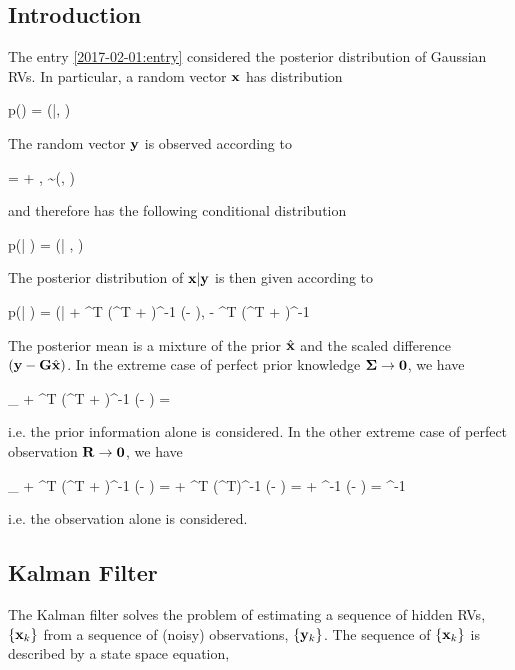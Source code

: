 
\subsection{Introduction}

The entry \ref{2017-02-01:entry} considered the posterior distribution of Gaussian RVs. In particular, a random vector $\mathbf{x}$ has distribution

\bee
p(\xbf) = \Nc(\xbf|\hat\xbf, \Sigmabf)
\eee

The random vector $\mathbf{y}$ is observed according to

\bee
\ybf = \Gbf \xbf + \vbf, \quad \vbf \sim \Nc(\zerobf, \Rbf)
\eee

and therefore has the following conditional distribution

\bee
p(\ybf | \xbf) = \Nc(\ybf | \Gbf \xbf, \Rbf)
\eee

The posterior distribution of $\mathbf{x} | \mathbf{y}$ is then given according to

\bee
p(\xbf | \ybf) = \Nc(\xbf | \hat\xbf + \Sigmabf \Gbf^T (\Gbf \Sigmabf \Gbf^T + \Rbf )^{-1} (\ybf - \Gbf \hat\xbf), \Sigmabf - \Sigmabf \Gbf^T (\Gbf \Sigmabf \Gbf^T + \Rbf)^{-1} \Gbf \Sigmabf
\eee

The posterior mean is a mixture of the prior $\hat{\mathbf{x}}$ and the scaled difference $(\mathbf{y} - \mathbf{G} \hat{\mathbf{x}})$. In the extreme case of perfect prior knowledge $\mathbf{\Sigma} \rightarrow \mathbf{0}$, we have

\bee
\lim_{\Sigmabf \rightarrow \zerobf} \hat\xbf + \Sigmabf \Gbf^T (\Gbf \Sigmabf \Gbf^T + \Rbf )^{-1} (\ybf - \Gbf \hat\xbf) = \hat\xbf
\eee

i.e. the prior information alone is considered. In the other extreme case of perfect observation $\mathbf{R} \rightarrow \mathbf{0}$, we have

\bee
\lim_{\Rbf \rightarrow \zerobf} \hat\xbf + \Sigmabf \Gbf^T (\Gbf \Sigmabf \Gbf^T + \Rbf )^{-1} (\ybf - \Gbf \hat\xbf) = \hat\xbf + \Sigmabf \Gbf^T (\Gbf \Sigmabf \Gbf^T)^{-1} (\ybf - \Gbf \hat\xbf) = \hat\xbf + \Gbf^{-1} (\ybf - \Gbf \hat\xbf) = \Gbf^{-1} \ybf
\eee

i.e. the observation alone is considered.


\subsection{Kalman Filter}

The Kalman filter solves the problem of estimating a sequence of hidden RVs, $\{ \mathbf{x}_k \}$ from a sequence of (noisy) observations, $\{ \mathbf{y}_k \}$. The sequence of $\{ \mathbf{x}_k \}$ is described by a state space equation,

